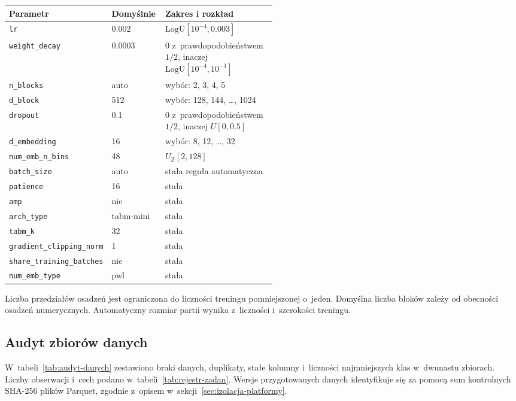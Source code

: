 \par\medskip\noindent\begin{minipage}{\linewidth}\captionsetup{hypcap=false}\centering\footnotesize
{}
\begin{tabularx}{\linewidth}{@{}P{0.32\linewidth}P{0.20\linewidth}Y@{}}
\toprule Parametr & Domyślnie & Zakres i rozkład \\
\midrule
\texttt{lr} & 0.002 & $\mathrm{LogU}[10^{-4},0.003]$ \\
\texttt{weight\_decay} & 0.0003 & 0 z~prawdopodobieństwem $1/2$, inaczej $\mathrm{LogU}[10^{-4},10^{-1}]$ \\
\texttt{n\_blocks} & auto & wybór: 2, 3, 4, 5 \\
\texttt{d\_block} & 512 & wybór: 128, 144, \ldots, 1024 \\
\texttt{dropout} & 0.1 & 0 z~prawdopodobieństwem $1/2$, inaczej $U[0,0.5]$ \\
\texttt{d\_embedding} & 16 & wybór: 8, 12, \ldots, 32 \\
\texttt{num\_emb\_n\_bins} & 48 & $U_{\mathbb Z}[2,128]$ \\
\texttt{batch\_size} & auto & stała reguła automatyczna \\
\texttt{patience} & 16 & stała \\
\texttt{amp} & nie & stała \\
\texttt{arch\_type} & tabm-mini & stała \\
\texttt{tabm\_k} & 32 & stała \\
\texttt{gradient\_clipping\_norm} & 1 & stała \\
\texttt{share\_training\_batches} & nie & stała \\
\texttt{num\_emb\_type} & pwl & stała \\
\bottomrule\end{tabularx}\end{minipage}\par\medskip

Liczba przedziałów osadzeń jest ograniczona do liczności treningu pomniejszonej o~jeden. Domyślna liczba bloków zależy od obecności osadzeń numerycznych. Automatyczny rozmiar partii wynika z~liczności i~szerokości treningu.

\subsection*{Audyt zbiorów danych}
\label{app:audyt}

W~tabeli~\ref{tab:audyt-danych} zestawiono braki danych, duplikaty, stałe kolumny i~liczności najmniejszych klas w~dwunastu zbiorach. Liczby obserwacji i~cech podano w~tabeli~\ref{tab:rejestr-zadan}. Wersje przygotowanych danych identyfikuje się za pomocą sum kontrolnych SHA-256 plików Parquet, zgodnie z~opisem w~sekcji~\ref{sec:izolacja-platformy}.

